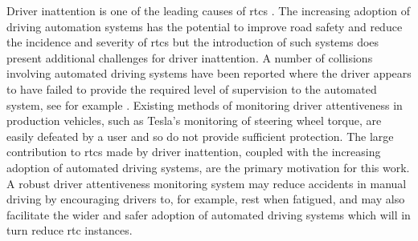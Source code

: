 \documentclass[11pt, parskip=half*,twoside=false]{scrbook}
\begin{document}

Driver inattention is one of the leading causes of \glspl{rtc} \citep{petridouHumanFactorsCausation2000,youngDriverDistraction2007,olsonDriverDistractionCommercial2009}. The increasing adoption of driving automation systems has the potential to improve road safety and reduce the incidence and severity of \glspl{rtc} \citep{favaroExaminingAccidentReports2017} but the introduction of such systems does present additional challenges for driver inattention. A number of collisions involving automated driving systems have been reported where the driver appears to have failed to provide the required level of supervision to the automated system, see for example \citep{ntsbCollisionSportUtility2019,ntsbCollisionCarOperating2019}. Existing methods of monitoring driver attentiveness in production vehicles, such as Tesla's monitoring of steering wheel torque, are easily defeated by a user and so do not provide sufficient protection. The large contribution to \glspl{rtc} made by driver inattention, coupled with the increasing adoption of automated driving systems, are the primary motivation for this work. A robust driver attentiveness monitoring system may reduce accidents in manual driving by encouraging drivers to, for example, rest when fatigued, and may also facilitate the wider and safer adoption of automated driving systems which will in turn reduce \gls{rtc} instances. 
\end{document}

